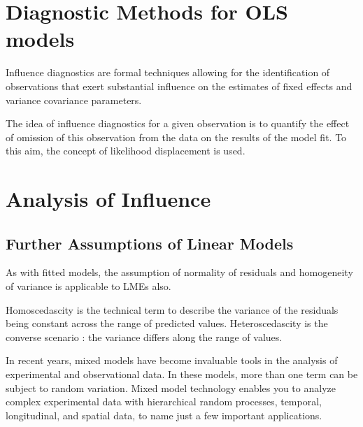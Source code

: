 \documentclass[12pt, a4paper]{article}
\begin{document}
\section*{Diagnostic Methods for OLS models}
Influence diagnostics are formal techniques allowing for the identification of observations that exert substantial influence on the estimates of fixed effects and variance covariance parameters. 
	
The idea of influence diagnostics for a given observation is to quantify the effect of omission of this observation from the data on the results of the model fit. To this aim, the concept of likelihood displacement is used. 
	
	


\section{Analysis of  Influence}



\subsection{Further Assumptions of Linear Models}

As with fitted models, the assumption of normality of residuals and homogeneity of variance is applicable to LMEs also. 



Homoscedascity is the technical term to describe the variance of the residuals being constant across the range of predicted values.
Heteroscedascity is the converse scenario : the variance differs along the range of values.


% 
% 



In recent years, mixed models have become invaluable tools in the analysis of experimental and observational
data. In these models, more than one term can be subject to random variation. Mixed model technology enables you to analyze complex experimental data with hierarchical random processes, temporal,
longitudinal, and spatial data, to name just a few important applications. 
\end{document}
